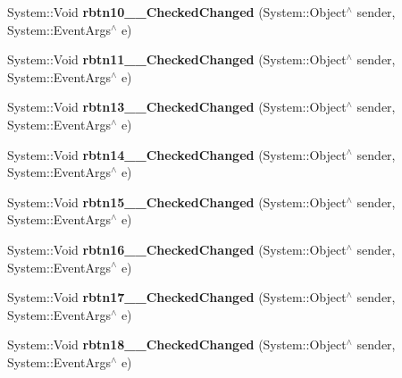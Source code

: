 \begin{DoxyCompactItemize}
\item 
\mbox{\label{class_project1_1_1_my_form_afaba6f80c0d13e63eab8b64d32f75bce}} 
System\+::\+Void {\bfseries rbtn10\+\_\+\_\+\+Checked\+Changed} (System\+::\+Object$^\wedge$ sender, System\+::\+Event\+Args$^\wedge$ e)
\item 
\mbox{\label{class_project1_1_1_my_form_a323b3d62184688deeeb47f4fd6928f9c}} 
System\+::\+Void {\bfseries rbtn11\+\_\+\_\+\+Checked\+Changed} (System\+::\+Object$^\wedge$ sender, System\+::\+Event\+Args$^\wedge$ e)
\item 
\mbox{\label{class_project1_1_1_my_form_abc214ca43d956c5bf09fd3095ed3a0b3}} 
System\+::\+Void {\bfseries rbtn13\+\_\+\_\+\+Checked\+Changed} (System\+::\+Object$^\wedge$ sender, System\+::\+Event\+Args$^\wedge$ e)
\item 
\mbox{\label{class_project1_1_1_my_form_a518d4cc8f22d3e774e51a31efb748104}} 
System\+::\+Void {\bfseries rbtn14\+\_\+\_\+\+Checked\+Changed} (System\+::\+Object$^\wedge$ sender, System\+::\+Event\+Args$^\wedge$ e)
\item 
\mbox{\label{class_project1_1_1_my_form_a5362cf5821652c5ae0fe26144996d339}} 
System\+::\+Void {\bfseries rbtn15\+\_\+\_\+\+Checked\+Changed} (System\+::\+Object$^\wedge$ sender, System\+::\+Event\+Args$^\wedge$ e)
\item 
\mbox{\label{class_project1_1_1_my_form_a7fafc60ade71227182198240af14bafa}} 
System\+::\+Void {\bfseries rbtn16\+\_\+\_\+\+Checked\+Changed} (System\+::\+Object$^\wedge$ sender, System\+::\+Event\+Args$^\wedge$ e)
\item 
\mbox{\label{class_project1_1_1_my_form_ae36f900ba2077ee9b90acc3090a2e064}} 
System\+::\+Void {\bfseries rbtn17\+\_\+\_\+\+Checked\+Changed} (System\+::\+Object$^\wedge$ sender, System\+::\+Event\+Args$^\wedge$ e)
\item 
\mbox{\label{class_project1_1_1_my_form_aa668b69465343a28b40587d91d16096c}} 
System\+::\+Void {\bfseries rbtn18\+\_\+\_\+\+Checked\+Changed} (System\+::\+Object$^\wedge$ sender, System\+::\+Event\+Args$^\wedge$ e)

\end{DoxyCompactItemize}
